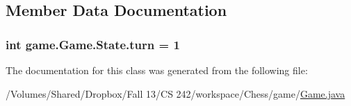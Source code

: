 \subsection{Member Data Documentation}
\hypertarget{classgame_1_1_game_1_1_state_a3cc50de4b7853ee4dfcd559a29ffffd3}{
\subsubsection[{turn}]{\setlength{\rightskip}{0pt plus 5cm}int game.\-Game.\-State.\-turn = 1\hspace{0.3cm}{\ttfamily [private]}}}\label{classgame_1_1_game_1_1_state_a3cc50de4b7853ee4dfcd559a29ffffd3}


The documentation for this class was generated from the following file\-:\begin{DoxyCompactItemize}
\item 
/\-Volumes/\-Shared/\-Dropbox/\-Fall 13/\-C\-S 242/workspace/\-Chess/game/\hyperlink{_game_8java}{Game.\-java}\end{DoxyCompactItemize}
